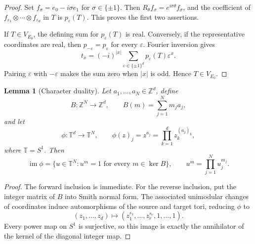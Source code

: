 \documentclass[11pt]{amsart}
\newtheorem{lemma}[theorem]{Lemma}
\theoremstyle{remark}
\newcommand{\Z}{\mathbb{Z}}
\newcommand{\Torus}{\mathbb{T}}
\begin{document}
\begin{proof}
Set $f_\sigma=e_0-i\sigma e_1$ for $\sigma\in\{\pm1\}$. Then
$R_\theta f_\sigma=e^{i\sigma\theta}f_\sigma$, and the coefficient of
$f_{\varepsilon_1}\otimes\cdots\otimes f_{\varepsilon_d}$ in $T$ is
$p_\varepsilon(T)$. This proves the first two assertions.

If $T\in V_{E_0}$, the defining sum for $p_\varepsilon(T)$ is real.
Conversely, if the representative coordinates are real, then
$p_{-\varepsilon}=p_\varepsilon$ for every $\varepsilon$. Fourier inversion
gives
\[
t_x=(-i)^{|x|}
\sum_{\varepsilon\in\{\pm1\}^d}p_\varepsilon(T)\varepsilon^x.
\]
Pairing $\varepsilon$ with $-\varepsilon$ makes the sum zero when $|x|$ is
odd. Hence $T\in V_{E_0}$.
\end{proof}

\begin{lemma}[Character duality]\label{lem:torus}
Let $a_1,\ldots,a_N\in\Z^d$, define
\[
B:\Z^N\longrightarrow\Z^d,
\qquad B(m)=\sum_{j=1}^Nm_ja_j,
\]
and let
\[
\phi:\Torus^d\longrightarrow\Torus^N,
\qquad
\phi(z)_j=z^{a_j}=\prod_{k=1}^dz_k^{(a_j)_k},
\]
where $\Torus=S^1$. Then
\[
\operatorname{im}\phi
=
\{u\in\Torus^N:u^m=1\text{ for every }m\in\ker B\},
\qquad
u^m=\prod_{j=1}^Nu_j^{m_j}.
\]
\end{lemma}

\begin{proof}
The forward inclusion is immediate. For the reverse inclusion, put the
integer matrix of $B$ into Smith normal form. The associated unimodular
changes of coordinates induce automorphisms of the source and target tori,
reducing $\phi$ to
\[
(z_1,\ldots,z_d)
\longmapsto
(z_1^{s_1},\ldots,z_r^{s_r},1,\ldots,1).
\]
Every power map on $S^1$ is surjective, so this image is exactly the
annihilator of the kernel of the diagonal integer map.
\end{proof}
\end{document}
